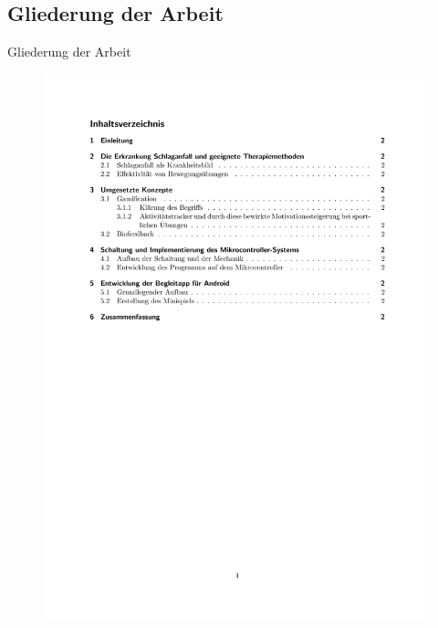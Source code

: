 \documentclass[hyphens]{beamer}
\begin{document}
 \subsection{Gliederung der Arbeit}
 \begin{frame}{Gliederung der Arbeit}
 \begin{figure}
\centering \includegraphics[width=\textwidth]{pics/gliederung.pdf}
\end{figure}
 \end{frame}
 
\end{document}
